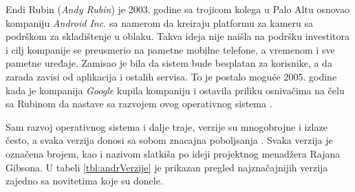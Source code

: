 \documentclass[android.tex]{subfiles}
\begin{document}
Endi Rubin (\textit{Andy Rubin}) je 2003. godine sa trojicom kolega u Palo Altu osnovao kompaniju \textit{Android Inc. }sa namerom da kreiraju platformu za kameru sa podrškom za skladištenje u oblaku. Takva ideja nije naišla na podršku investitora i cilj kompanije se preusmerio na  pametne mobilne telefone, a vremenom i sve pametne uređaje. Zamisao je bila da sistem bude besplatan za korisnike, a da zarada zavisi od aplikacija i ostalih servisa. To je postalo moguće 2005. godine kada je kompanija \textit{Google} kupila kompaniju i ostavila priliku osnivačima na čelu sa Rubinom da nastave sa razvojem ovog operativnog sistema \cite{book:krajci}. 

Sam razvoj operativnog sistema i dalje traje, verzije su mnogobrojne i izlaze često, a svaka verzija donosi sa sobom znacajna poboljsanja
 \cite{sajt:androidDevelopers,book:mzivkovic}.  Svaka verzija je označena brojem, kao i nazivom slatkiša po ideji projektnog menadžera Rajana Gibsona. U tabeli \ref{tbl:andrVerzije} je prikazan pregled najznačajnijih verzija zajedno sa novitetima koje su donele. 
\end{document}
